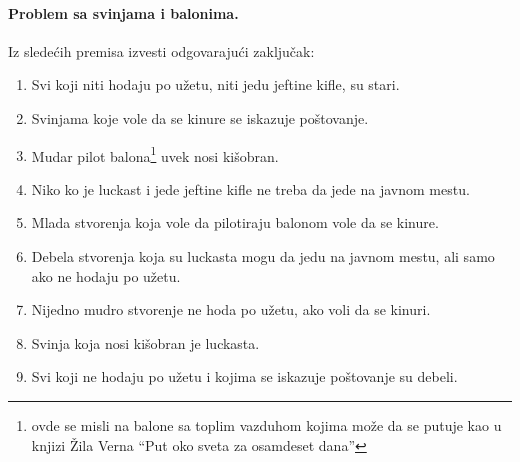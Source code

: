\paragraph{Problem sa svinjama i balonima.}
Iz slede\'cih premisa izvesti odgovaraju\'ci zaklju\v cak:
\begin{enumerate}
\item%
  Svi koji niti hodaju po u\v zetu, niti jedu jeftine kifle, su stari.
\item%
  Svinjama koje vole da se kin\dj ure se iskazuje po\v stovanje.
\item%
  Mudar pilot balona\footnote{ovde se misli na balone sa toplim vazduhom kojima mo\v ze da se putuje kao u knjizi \v Zila Verna
  \enquote{Put oko sveta za osamdeset dana}} uvek nosi ki\v sobran.
\item%
  Niko ko je luckast i jede jeftine kifle ne treba da jede na javnom mestu.
\item%
  Mlada stvorenja koja vole da pilotiraju balonom vole da se kin\dj ure.
\item%
  Debela stvorenja koja su luckasta mogu da jedu na javnom mestu, ali samo ako ne hodaju po u\v zetu.
\item%
  Nijedno mudro stvorenje ne hoda po u\v zetu, ako voli da se kin\dj uri.
\item%
  Svinja koja nosi ki\v sobran je luckasta.
\item%
  Svi koji ne hodaju po u\v zetu i kojima se iskazuje po\v stovanje su debeli.
\end{enumerate}

